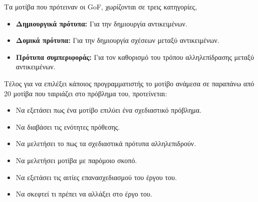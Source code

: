 \par
Τα μοτίβα που πρότειναν οι GoF, χωρίζονται σε τρεις κατηγορίες, 
\begin{itemize}
    \item \textbf{Δημιουργικά πρότυπα:} Για την δημιουργία αντικειμένων.
    \item \textbf{Δομικά πρότυπα:} Για την δημιουργία σχέσεων μεταξύ αντικειμένων.
    \item \textbf{Πρότυπα συμπεριφοράς:} Για τον καθορισμό του τρόπου αλληλεπίδρασης μεταξύ αντικειμένων.
\end{itemize}
\par
Τέλος για να επιλέξει κάποιος προγραμματιστής το μοτίβο ανάμεσα σε παραπάνω από 
20 μοτίβα που ταιριάζει στο πρόβλημα του, προτείνεται: 
\begin{itemize}
    \item Να εξετάσει πως ένα μοτίβο επιλύει ένα σχεδιαστικό πρόβλημα.
    \item Να διαβάσει τις ενότητες πρόθεσης.
    \item Να μελετήσει το πως τα σχεδιαστικά πρότυπα αλληλεπιδρούν.
    \item Να μελετήσει μοτίβα με παρόμοιο σκοπό.
    \item Να εξετάσει τις αιτίες επανασχεδιασμού του έργου του.
    \item Να σκεφτεί τι πρέπει να αλλάξει στο έργο του.
\end{itemize}
